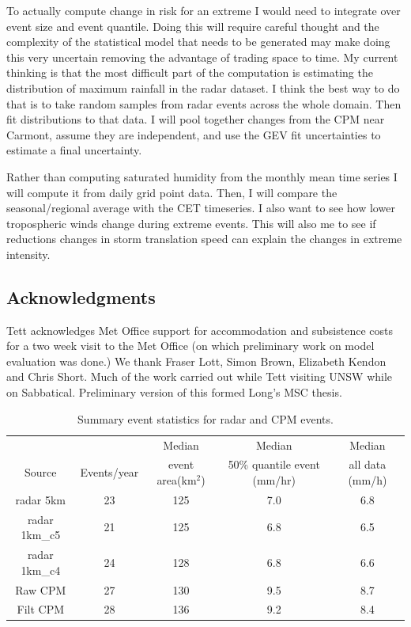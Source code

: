 \documentclass[11pt,a4paper]{article}
\begin{document}
 
 To actually  compute change in risk for an extreme I would need to integrate over event size and event quantile. Doing this will require careful thought and the complexity of the statistical model  that needs to be generated may make doing this very uncertain removing the advantage of trading space to time.  My current thinking is that the most difficult part of the computation is estimating the distribution of maximum rainfall in the radar dataset. I think the best way to do that is to take random samples from radar events across the whole domain. Then fit distributions to that data.  I will pool together changes from the CPM near Carmont, assume they are independent, and use the GEV fit  uncertainties to estimate a final uncertainty. 

 
Rather than computing saturated humidity from the monthly mean time series I will compute it from daily grid point data. Then, I will compare the seasonal/regional average with the CET timeseries.  I also want to see how lower tropospheric  winds change during extreme events. This will also me to see if reductions changes in storm translation speed can explain the changes in extreme intensity. 

\printbibliography %

\subsection{Acknowledgments}
Tett acknowledges  Met Office support for accommodation and subsistence costs for a two week visit to the Met Office (on which preliminary work on model evaluation was done.) We thank Fraser Lott, Simon Brown, Elizabeth Kendon and Chris Short. Much of the  work carried out while Tett visiting UNSW while on Sabbatical. Preliminary version of this formed Long's MSC thesis. 

\begin{table}
	\begin{tabular}{ccccc}
		& & Median & Median & Median\\
		Source & Events/year & event area(km$^2$) & 50\% quantile event (mm/hr) & all data (mm/h)\\
		radar 5km & 23 & 125 & 7.0 & 6.8 \\
		radar 1km\_c5 & 21 & 125 & 6.8 & 6.5\\
		radar 1km\_c4 & 24 & 128 & 6.8 & 6.6\\ \hline
		Raw CPM & 27 & 130  & 9.5 & 8.7\\
		Filt CPM & 28 & 136 & 9.2 & 8.4\\
		
	\end{tabular}
	\label{tab:summary}
	\caption{Summary event statistics for radar and CPM events. }
\end{table}
\end{document}
